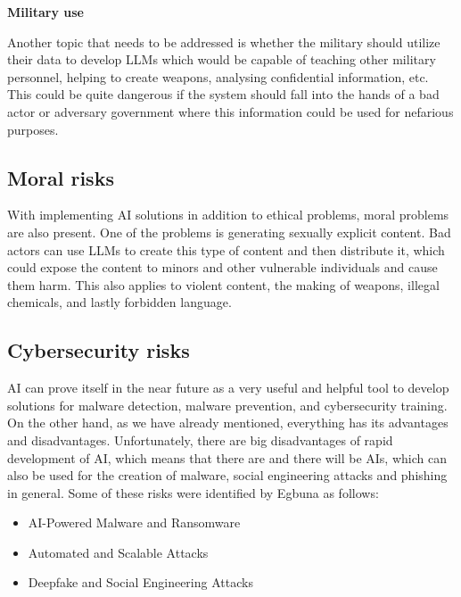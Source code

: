 \textbf{Military use}

Another topic that needs to be addressed is whether the military should utilize their data to develop LLMs which would be capable of teaching other military personnel, helping to create weapons, analysing confidential information, etc. This could be quite dangerous if the system should fall into the hands of a bad actor or adversary government where this information could be used for nefarious purposes.


\subsection{Moral risks}
With implementing AI solutions in addition to ethical problems, moral problems are also present. One of the problems is generating sexually explicit content. Bad actors can use LLMs to create this type of content and then distribute it, which could expose the content to minors and other vulnerable individuals and cause them harm. This also applies to violent content, the making of weapons, illegal chemicals, and lastly forbidden language.


\subsection{Cybersecurity risks}
AI can prove itself in the near future as a very useful and helpful tool to develop solutions for malware detection, malware prevention, and cybersecurity training. On the other hand, as we have already mentioned, everything has its advantages and disadvantages. Unfortunately, there are big disadvantages of rapid development of AI, which means that there are and there will be AIs, which can also be used for the creation of malware, social engineering attacks and phishing in general. Some of these risks were identified by Egbuna\cite{Princess-Egbuna_2021} as follows:

\begin{itemize}
    \item AI-Powered Malware and Ransomware
    \item Automated and Scalable Attacks
    \item Deepfake and Social Engineering Attacks
\end{itemize}

